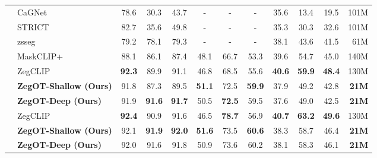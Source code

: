 \documentclass[nohyperref]{article}
\theoremstyle{plain}
\theoremstyle{definition}
\theoremstyle{remark}
\begin{document}
\begin{table}[t]
\begin{center}
{\begin{tabular}{clcccccccccr}
     & CaGNet~\cite{gu2020cagnet} & 78.6 & 30.3 & 43.7 & - & - & - &  35.6   &  13.4   &  19.5 & 101M \\
    &STRICT~\cite{pastore2021strict}    & 82.7 & 35.6 & 49.8 & - & - & - &  35.3   &  30.3   &  32.6 & 101M\\
    &zsseg~\cite{xu2021zsseg}  & 79.2 & 78.1 & 79.3 & - & - & - &  38.1   &  43.6   &  41.5  & 61M \\
    &MaskCLIP+~\cite{zhou2022maskclip} & 88.1 & 86.1 & 87.4 & 48.1 & 66.7 & 53.3 & 39.6   & 54.7 & 45.0 & 140M \\
    &ZegCLIP~\cite{zhou2022zegclip} & \textbf{92.3} & 89.9 & 91.1 & 46.8 & 68.5 & 55.6 & \textbf{40.6}  & \textbf{59.9} & \textbf{48.4} & 130M \\
    &\textbf{ZegOT-Shallow (Ours)} & 91.8 & 87.3 & 89.5 & \textbf{51.1} & 72.5 & \textbf{59.9} &  37.9 & 49.2 & 42.8 &  \textbf{21M}  \\
    &\textbf{ZegOT-Deep (Ours)} & 91.9 & \textbf{91.6} & \textbf{91.7} & 50.5 & \textbf{72.5} & 59.5 & 37.6 & 49.0 & 42.5 & \textbf{21M} \\
    \cmidrule(r){1-1} \cmidrule(r){2-2}	\cmidrule(r){3-4} \cmidrule(r){5-5} \cmidrule(r){6-7} \cmidrule(r){8-8} \cmidrule(r){9-10} \cmidrule(r){11-11} \cmidrule(l){12-12}

    
    &ZegCLIP~\cite{zhou2022zegclip}      & \textbf{92.4} & 90.9 & 91.6 & 46.5 & \textbf{78.7} & 56.9 & \textbf{40.7} & \textbf{63.2} & \textbf{49.6} & 130M  \\
    &\textbf{ZegOT-Shallow (Ours)} & 92.1 & \textbf{91.9} & \textbf{92.0} & \textbf{51.6} & 73.5 & \textbf{60.6} & 38.3 & 58.7 & 46.4 & \textbf{21M} \\
    &\textbf{ZegOT-Deep (Ours)} & 92.0 & 91.6 & 91.8 & 50.9 & 73.6 & 60.2 & 38.1 & 58.3 & 46.1 & \textbf{21M} \\
    \bottomrule	
        
\end{tabular}
		}
\end{center}
	\vskip -0.1in
\end{table}
\end{document}
